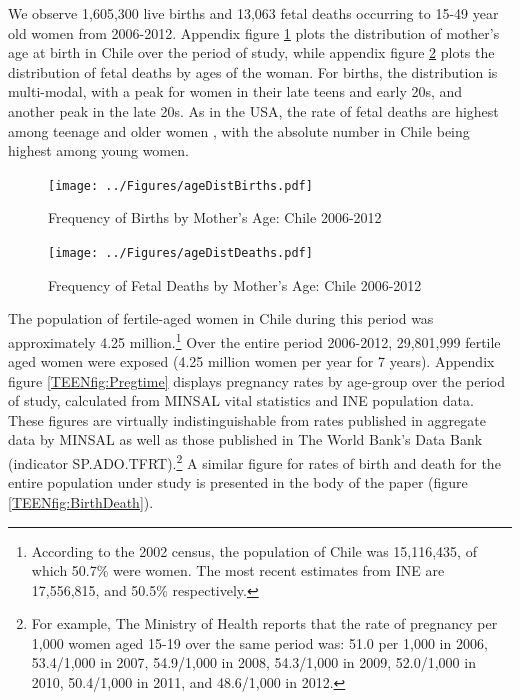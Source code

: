 \documentclass[11pt,subeqn]{article}
\begin{document}
\begin{spacing}{1.4}
We observe 1,605,300 live births and 13,063 fetal deaths occurring to 15-49 year 
old women from 2006-2012.  Appendix figure \ref{TEENfig:ageHist} plots the 
distribution of mother's age at birth in Chile over the period of study, while
appendix figure \ref{TEENfig:ageHistD} plots the distribution of fetal deaths by 
ages of the woman.  For births, the distribution is multi-modal, 
with a peak for women in their late teens and early 20s, and another peak in the 
late 20s.  As in the USA, the rate of fetal deaths are highest among teenage and 
older women \citep{MacDormanGregory2015}, with the absolute number in Chile 
being highest among young women.

\begin{figure}[htpb!]
\begin{center}
\caption{Frequency of Births by Mother's Age: Chile 2006-2012}
\label{TEENfig:ageHist}
\texttt{[image: ../Figures/ageDistBirths.pdf]} 
\end{center}
\end{figure}

\begin{figure}[htpb!]
\begin{center}
\caption{Frequency of Fetal Deaths by Mother's Age: Chile 2006-2012}
\label{TEENfig:ageHistD}
\texttt{[image: ../Figures/ageDistDeaths.pdf]} 
\end{center}
\vspace{-4mm}
\end{figure}

The population of fertile-aged women in Chile during this period was 
approximately 4.25 million.\footnote{According to the 2002 census, the population
of Chile was 15,116,435, of which 50.7\% were women.  The most recent estimates
from INE are 17,556,815, and 50.5\% respectively.}  Over the entire period 
2006-2012, 29,801,999 fertile aged women were exposed (4.25 million women per 
year for 7 years).  Appendix figure \ref{TEENfig:Pregtime} displays pregnancy 
rates by age-group over the period of study, calculated from MINSAL vital
statistics and INE population data. These figures are virtually indistinguishable 
from rates published in aggregate data by MINSAL \citep{MINSAL2013} as well as
those published in The World Bank's Data Bank (indicator SP.ADO.TFRT).\footnote{%
For example, The Ministry of Health reports that the rate of pregnancy per 1,000
women aged 15-19 over the same period was: 51.0 per 1,000 in 2006, 53.4/1,000
in 2007, 54.9/1,000 in 2008, 54.3/1,000 in 2009, 52.0/1,000 in 2010, 
50.4/1,000 in 2011, and 48.6/1,000 in 2012.}  A similar figure for rates of
birth and death for the entire population under study is presented in the
body of the paper (figure \ref{TEENfig:BirthDeath}).


\end{spacing}
\end{document}
